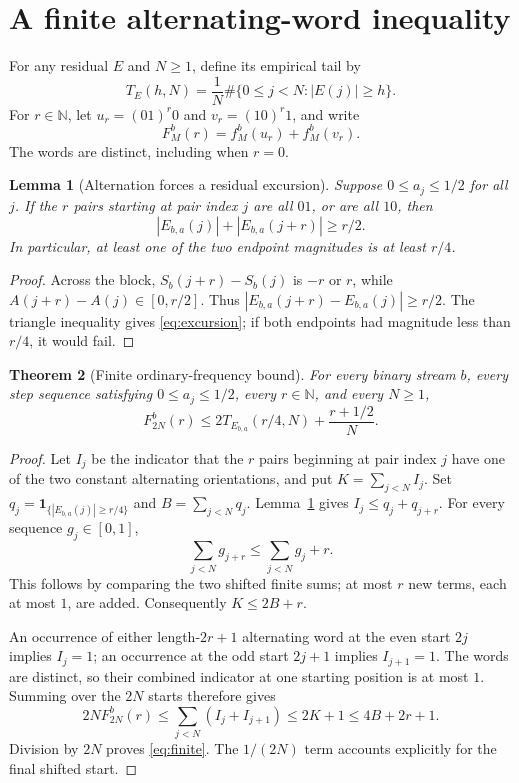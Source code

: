 \documentclass[11pt,a4paper]{article}
\newtheorem{theorem}{Theorem}[section]
\newtheorem{lemma}[theorem]{Lemma}
\theoremstyle{definition}
\theoremstyle{remark}
\newcommand{\N}{\mathbb N}
\newcommand{\ind}{\mathbf 1}
\begin{document}
\section{A finite alternating-word inequality}
\label{sec:finite}

For any residual $E$ and $N\ge1$, define its empirical tail by
\begin{equation}
 T_E(h,N)=\frac1N\#\{0\le j<N:|E(j)|\ge h\}.
 \label{eq:tail}
\end{equation}
For $r\in\N$, let $u_r=(01)^r0$ and $v_r=(10)^r1$, and write
\begin{equation}
 F_M^b(r)=f_M^b(u_r)+f_M^b(v_r).
 \label{eq:altfreq}
\end{equation}
The words are distinct, including when $r=0$.

\begin{lemma}[Alternation forces a residual excursion]
\label{lem:excursion}
Suppose $0\le a_j\le1/2$ for all $j$.
If the $r$ pairs starting at pair index $j$ are all $01$, or are all
$10$, then
\begin{equation}
 |E_{b,a}(j)|+|E_{b,a}(j+r)|\ge r/2.
 \label{eq:excursion}
\end{equation}
In particular, at least one of the two endpoint magnitudes is at
least $r/4$.
\end{lemma}
\begin{proof}
Across the block, $S_b(j+r)-S_b(j)$ is $-r$ or $r$,
while $A(j+r)-A(j)\in[0,r/2]$.
Thus $|E_{b,a}(j+r)-E_{b,a}(j)|\ge r/2$.
The triangle inequality gives \eqref{eq:excursion};
if both endpoints had magnitude less than $r/4$, it would fail.
\end{proof}

\begin{theorem}[Finite ordinary-frequency bound]
\label{thm:finite}
For every binary stream $b$, every step sequence satisfying
$0\le a_j\le1/2$, every $r\in\N$, and every $N\ge1$,
\begin{equation}
 \boxed{\displaystyle
 F_{2N}^b(r)\le
 2T_{E_{b,a}}(r/4,N)+\frac{r+1/2}{N}.}
 \label{eq:finite}
\end{equation}
\end{theorem}
\begin{proof}
Let $I_j$ be the indicator that the $r$ pairs beginning at pair index
$j$ have one of the two constant alternating orientations, and put
$K=\sum_{j<N}I_j$. Set
$q_j=\ind_{\{|E_{b,a}(j)|\ge r/4\}}$ and $B=\sum_{j<N}q_j$.
Lemma~\ref{lem:excursion} gives $I_j\le q_j+q_{j+r}$.
For every sequence $g_j\in[0,1]$,
\[
 \sum_{j<N}g_{j+r}\le\sum_{j<N}g_j+r.
\]
This follows by comparing the two shifted finite sums; at most $r$
new terms, each at most $1$, are added.
Consequently $K\le2B+r$.

An occurrence of either length-$2r+1$ alternating word at the even
start $2j$ implies $I_j=1$; an occurrence at the odd start $2j+1$
implies $I_{j+1}=1$. The words are distinct, so their combined
indicator at one starting position is at most $1$.
Summing over the $2N$ starts therefore gives
\[
 2N F_{2N}^b(r)
 \le\sum_{j<N}(I_j+I_{j+1})
 \le2K+1\le4B+2r+1.
\]
Division by $2N$ proves \eqref{eq:finite}.
The $1/(2N)$ term accounts explicitly for the final shifted start.
\end{proof}
\end{document}
